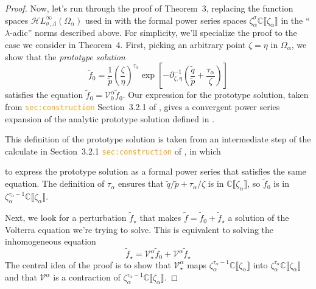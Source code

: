 \documentclass{article}
\newcommand{\singexp}[2]{\mathcal{H}L^\infty_{#1, #2}}
\newcommand{\C}{\mathbb{C}}
\newcommand{\volterra}{\mathcal{V}}
\newcommand{\hardpart}{\mathcal{V}_0}
\newcommand{\softpart}{\mathcal{V}_\star}
\newcommand{\solproto}{f_0}
\newcommand{\fmlsolwhole}{\series{f}}
\newcommand{\fmlsolproto}{\series{f}_0}
\newcommand{\fmlsolptb}{\series{f}_\star}
\newcommand{\series}[1]{\tilde{#1}}
\theoremstyle{definition}
\theoremstyle{plain}
\begin{document}
{\begin{proof}
Now, let's run through the proof of Theorem~3, replacing the function spaces $\singexp{\sigma}{\Lambda}(\Omega_\alpha)$ used in \cite{reg-sing-volterra} with the formal power series spaces $\zeta_\alpha^\sigma \C\llbracket \zeta_\alpha \rrbracket$ in the ``$\lambda$-adic'' norms described above. For simplicity, we'll specialize the proof to the case we consider in Theorem~4. First, picking an arbitrary point $\zeta = \eta$ in $\Omega_\alpha$, we show that the {\em prototype solution}
\[ \fmlsolproto = \frac{1}{\series{p}} \left(\frac{\zeta}{\eta}\right)^{\tau_\alpha} \exp\left[-\partial^{-1}_{\zeta, \eta} \left( \frac{\series{q}}{\series{p}} + \frac{\tau_\alpha}{\zeta} \right)\right] \]
satisfies the equation $\fmlsolproto = \hardpart^\alpha \fmlsolproto$. Our expression for the prototype solution, taken from \textcolor{orange}{\tt sec:construction} Section~3.2.1 of \cite{reg-sing-volterra}, gives a convergent power series expansion of the analytic prototype solution defined in \cite{reg-sing-volterra}.


This definition of the prototype solution is taken from an intermediate step of the calculate in Section~3.2.1 \textcolor{orange}{\tt sec:construction} of \cite{reg-sing-volterra}, in which


to express the prototype solution as a formal power series that satisfies the same equation. The definition of $\tau_\alpha$ ensures that $\series{q}/\series{p} + \tau_\alpha/\zeta$ is in $\C\llbracket \zeta_\alpha \rrbracket$, so $\fmlsolproto$ is in $\zeta_\alpha^{\tau_\alpha - 1} \C\llbracket \zeta_\alpha \rrbracket$.

Next, we look for a perturbation $\fmlsolptb$ that makes $\fmlsolwhole = \fmlsolproto + \fmlsolptb$ a solution of the Volterra equation we're trying to solve. This is equivalent to solving the inhomogeneous equation
\begin{equation}\label{eqn:inhomog-volterra2}
\fmlsolptb = \softpart^\alpha \fmlsolproto + \volterra^\alpha \fmlsolptb
\end{equation}
The central idea of the proof is to show that $\softpart^\alpha$ maps $\zeta_\alpha^{\tau_\alpha - 1} \C\llbracket \zeta_\alpha \rrbracket$ into $\zeta_\alpha^{\tau_\alpha} \C\llbracket \zeta_\alpha \rrbracket$ and that $\volterra^\alpha$ is a contraction of $\zeta_\alpha^{\tau_\alpha - 1} \C\llbracket \zeta_\alpha \rrbracket$.



\end{proof}}
\end{document}

